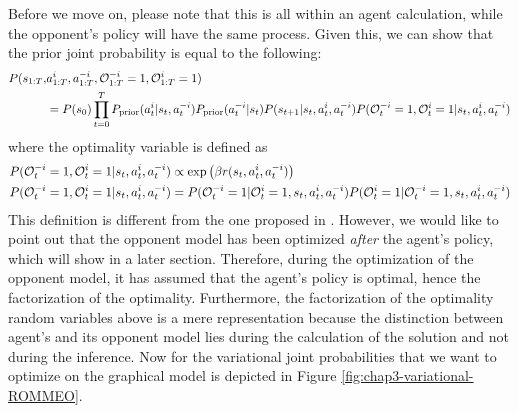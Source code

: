 Before we move on, please note that this is all within an agent calculation, while the opponent's policy will have the same process. Given this, we can show that the prior joint probability is equal to the following:
\begin{equation}
    \begin{aligned}
        P(s_{1:T}, &a^i_{1:T}, a^{-i}_{1:T}, \mathcal{O}^{-i}_{1:T} = 1, \mathcal{O}^{i}_{1:T} = 1) \\
        &= P(s_0) \prod^T_{t=0} P_{\text{prior}}(a^i_t | s_t, a^{-i}_t) P_{\text{prior}}(a^{-i}_t | s_t) P(s_{t+1} | s_t, a^i_t, a^{-i}_t) P(\mathcal{O}^{-i}_t = 1, \mathcal{O}^{i}_t = 1 | s_t, a^i_t, a^{-i}_t)
    \end{aligned}
\end{equation}
where the optimality variable is defined as 
\begin{equation}
\begin{aligned}
    &P(\mathcal{O}_t^{-i} = 1, \mathcal{O}^{i}_t = 1 | s_t, a^i_t, a^{-i}_t) \propto \exp \left(  \beta r(s_t, a^i_t, a^{-i}_t)   \right) \\
    &P(\mathcal{O}_t^{-i} = 1, \mathcal{O}^{i}_t = 1 | s_t, a^i_t, a^{-i}_t) = P(\mathcal{O}_t^{-i} = 1 |\mathcal{O}^{i}_t = 1, s_t, a^i_t, a^{-i}_t) P(\mathcal{O}^{i}_t = 1 | \mathcal{O}^{-i}_t = 1, s_t, a^i_t, a^{-i}_t)
\end{aligned}
\end{equation}
This definition is different from the one proposed in \cite{tian2019regularized}. However, we would like to point out that the opponent model has been optimized \textit{after} the agent's policy, which will show in a later section. Therefore, during the optimization of the opponent model, it has assumed that the agent's policy is optimal, hence the factorization of the optimality. Furthermore, the factorization of the optimality random variables above is a mere representation because the distinction between agent's and its opponent model lies during the calculation of the solution and not during the inference. Now for the variational joint probabilities that we want to optimize on the graphical model is depicted in Figure \ref{fig:chap3-variational-ROMMEO}.
